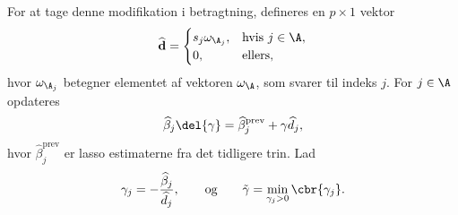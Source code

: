 For at tage denne modifikation i betragtning, defineres en \(p \times 1\) vektor
\begin{align*}
\widehat{\mathbf{d}} = \begin{cases}
s_j \omega_{\A_j}, &\text{hvis } j \in \A, \\
0, & \text{ellers},
\end{cases}
\end{align*}
hvor \(\omega_{\A_j}\) betegner elementet af vektoren \(\omega_{\A}\), som svarer til indeks \(j\).
For \(j \in \A\) opdateres
\begin{align*}
\widehat{\beta}_j \del{\gamma} = \widehat{\beta}_j^\text{prev} + \gamma \widehat{d}_j,
\end{align*}
hvor \(\widehat{\beta}_j^\text{prev}\) er lasso estimaterne fra det tidligere trin.
Lad 
\begin{align*}
\gamma_j = -\frac{\widehat{\beta}_j}{\widehat{d}_j}, \qquad \text{og} \qquad \tilde{\gamma} = \min_{\gamma_j > 0} \cbr{\gamma_j}.
\end{align*}
%
